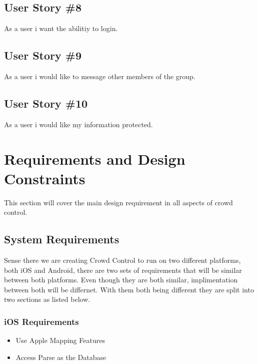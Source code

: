 \subsection{User Story \#8} 
As a user i want the abilitiy to login.

\subsection{User Story \#9}
As a user i would like to message other members of the group.

\subsection{User Story \#10} 
As a user i would like my information protected. 



\section{Requirements and Design Constraints}

This section will cover the main design requirement in all aspects of crowd control.


\subsection{System  Requirements}

Sense there we are creating Crowd Control to run on two different platforms, both iOS and Android, there are two sets of requirements that will be similar between both platforms. Even though they are both similar, implimentation between both will be differnet. With them both being different they are split into two sections as listed below.

\subsubsection{iOS Requirements}
\begin{itemize}
\item{Use Apple Mapping Features}
\item{Access Parse as the Database}
\end{itemize}
